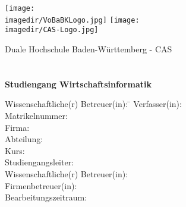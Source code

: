 \begin{titlepage}
\begin{minipage}{\textwidth}
		\vspace{-2cm}
		\noindent \texttt{[image: \\imagedir/VoBaBKLogo.jpg]} \hfill \texttt{[image: \\imagedir/CAS-Logo.jpg]}
\end{minipage}
\vspace{1.5em}
\begin{center}
	{\textsf{\large Duale Hochschule Baden-W\"urttemberg - CAS}}\\[4em]
	{\textsf{\textbf{\large{\DieArtDerArbeit}}}}\\[6mm]
	{\textsf{\textbf{\Large{}\DerTitelDerArbeit}}} \\[15mm]
	{\textsf{\textbf{\large{}Studiengang Wirtschaftsinformatik}}\\[6mm]
	}\vspace{10em}
	
	\begin{minipage}{\textwidth}
		\begin{tabbing}
		Wissenschaftliche(r) Betreuer(in): \hspace{0.85cm}\=\kill
		Verfasser(in): \> \DerAutorDerArbeit \\[1.5mm]
		Matrikelnummer: \> \DieMatrikelnummer \\[1.5mm]
		Firma: \> \DerNameDerFirma  \\[1.5mm]
		Abteilung: \> \DerNameDerAbteilung \\[1.5mm]
		Kurs: \> \DieKursbezeichnung \\[1.5mm]
		Studiengangsleiter: \> \DerStudiengangsleiter \\[1.5mm]
		Wissenschaftliche(r) Betreuer(in): \> \DerWissBetreuer \\[1.5mm]
		Firmenbetreuer(in): \> \DerFirmenBetreuer \\[1.5mm]
		Bearbeitungszeitraum: \> \DerBearbeitungszeitraum\\[1.5mm]
		\end{tabbing}
	\end{minipage}
\end{center}
\end{titlepage}